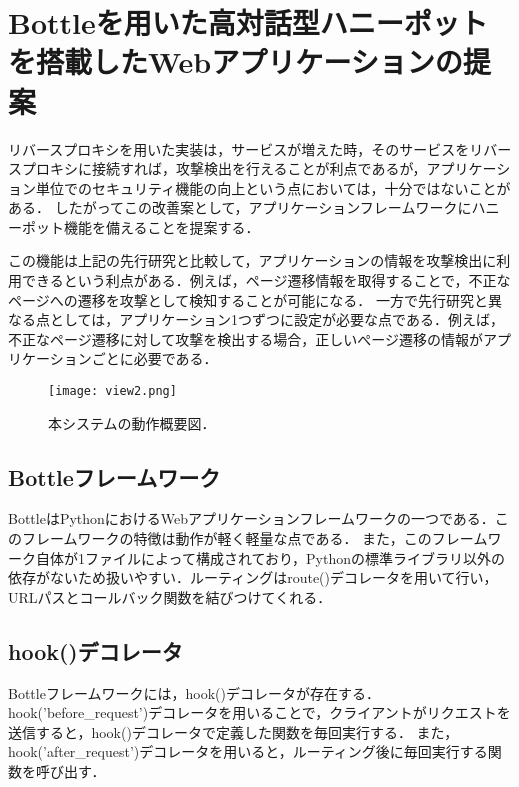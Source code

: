 \documentclass{css}
\begin{document}
\section{Bottleを用いた高対話型ハニーポットを搭載したWebアプリケーションの提案}
リバースプロキシを用いた実装は，サービスが増えた時，そのサービスをリバースプロキシに接続すれば，攻撃検出を行えることが利点であるが，アプリケーション単位でのセキュリティ機能の向上という点においては，十分ではないことがある．
したがってこの改善案として，アプリケーションフレームワークにハニーポット機能を備えることを提案する．
\par
この機能は上記の先行研究と比較して，アプリケーションの情報を攻撃検出に利用できるという利点がある．例えば，ページ遷移情報を取得することで，不正なページへの遷移を攻撃として検知することが可能になる．
一方で先行研究と異なる点としては，アプリケーション1つずつに設定が必要な点である．例えば，不正なページ遷移に対して攻撃を検出する場合，正しいぺージ遷移の情報がアプリケーションごとに必要である．

\begin{figure*}[htb]
\begin{center}
\texttt{[image: view2.png]}
\caption{本システムの動作概要図．}
\label{fig:two}
\end{center}
\end{figure*}

\subsection{Bottleフレームワーク}
Bottle\cite{Bottle}はPythonにおけるWebアプリケーションフレームワークの一つである．このフレームワークの特徴は動作が軽く軽量な点である．
また，このフレームワーク自体が1ファイルによって構成されており，Pythonの標準ライブラリ以外の依存がないため扱いやすい．ルーティングはroute()デコレータを用いて行い，URLパスとコールバック関数を結びつけてくれる．
\subsection{hook()デコレータ}
Bottleフレームワークには，hook()デコレータが存在する．hook('before\_request')デコレータを用いることで，クライアントがリクエストを送信すると，hook()デコレータで定義した関数を毎回実行する．
また，hook('after\_request')デコレータを用いると，ルーティング後に毎回実行する関数を呼び出す．
\end{document}
